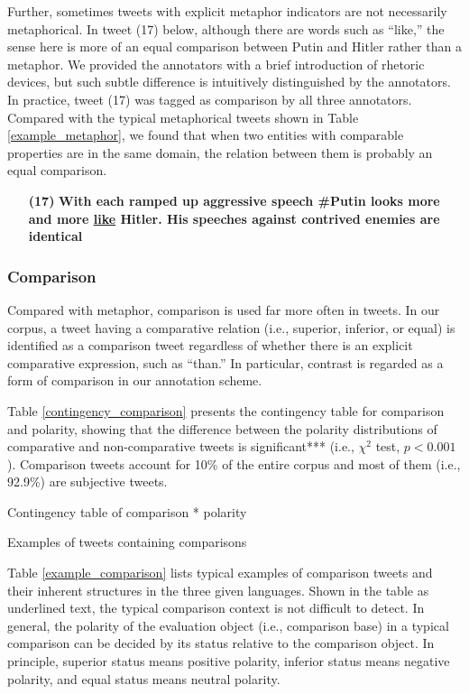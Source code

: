 \documentclass[english]{jnlp_1.4}
\begin{document}
Further, sometimes tweets with explicit metaphor indicators are not necessarily metaphorical. In tweet (17) below, although there are words such as ``like,'' the sense here is more of an equal comparison between Putin and Hitler rather than a metaphor. We provided the annotators with a brief introduction of rhetoric devices, but such subtle difference is intuitively distinguished by the annotators. In practice, tweet (17) was tagged as comparison by all three annotators. Compared with the typical metaphorical tweets shown in Table \ref{example_metaphor}, we found that when two entities with comparable properties are in the same domain, the relation between them is probably an equal comparison.
\begin{enumerate}
\item[{\bf (17)}] {\bf With each ramped up aggressive speech \#Putin looks more and more \underline{like} Hitler. His speeches against contrived enemies are identical}
\end{enumerate}


\subsubsection{Comparison}

Compared with metaphor, comparison is used far more often in tweets. In our corpus, a tweet having a comparative relation (i.e., superior, inferior, or equal) is identified as a comparison tweet regardless of whether there is an explicit comparative expression, such as ``than.'' In particular, contrast is regarded as a form of comparison in our annotation scheme.

Table \ref{contingency_comparison} presents the contingency table for comparison and polarity, showing that the difference between the polarity distributions of comparative and non-comparative tweets is significant*** (i.e., $\chi^2$ test, $p < 0.001$). Comparison tweets account for 10\% of the entire corpus and most of them (i.e., 92.9\%) are subjective tweets.

\begin{table}[b]
\caption{Contingency table of comparison * polarity}
\label{contingency_comparison}

\end{table}
\begin{table}[b]
\caption{Examples of tweets containing comparisons}
\label{example_comparison}

\end{table}

Table \ref{example_comparison} lists typical examples of comparison tweets and their inherent structures in the three given languages. Shown in the table as underlined text, the typical comparison context is not difficult to detect. In general, the polarity of the evaluation object (i.e., comparison base) in a typical comparison can be decided by its status relative to the comparison object. In principle, superior status means positive polarity, inferior status means negative polarity, and equal status means neutral polarity.
\end{document}
